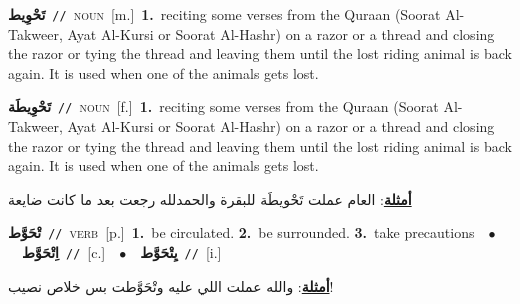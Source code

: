 \documentclass[10pt,a4paper,twoside]{article} %
\begin{document}
\begin{multicols}{2}
{\setlength\topsep{0pt}\textbf{\foreignlanguage{arabic}{تَحْوِيط}}\ {\color{gray}\texttt{//}\color{black}}\ \textsc{noun}\ [m.]\ \textbf{1.}~reciting some verses from the Quraan (Soorat Al-Takweer, Ayat Al-Kursi or Soorat Al-Hashr) on a razor or a thread and closing the razor or tying the thread and leaving them until the lost riding animal is back again. It is used when one of the animals gets lost.\ } \vspace{2mm}

{\setlength\topsep{0pt}\textbf{\foreignlanguage{arabic}{تَحْوِيطَة}}\ {\color{gray}\texttt{//}\color{black}}\ \textsc{noun}\ [f.]\ \textbf{1.}~reciting some verses from the Quraan (Soorat Al-Takweer, Ayat Al-Kursi or Soorat Al-Hashr) on a razor or a thread and closing the razor or tying the thread and leaving them until the lost riding animal is back again. It is used when one of the animals gets lost.\  \begin{flushright}\color{gray}\foreignlanguage{arabic}{\textbf{\underline{\foreignlanguage{arabic}{أمثلة}}}: العام عملت تَحْويطَة للبقرة والحمدلله رجعت بعد ما كانت ضايعة}\end{flushright}\color{black}} \vspace{2mm}

{\setlength\topsep{0pt}\textbf{\foreignlanguage{arabic}{تْحَوَّط}}\ {\color{gray}\texttt{//}\color{black}}\ \textsc{verb}\ [p.]\ \textbf{1.}~be circulated.  \textbf{2.}~be surrounded.  \textbf{3.}~take precautions\ \ $\bullet$\ \ \setlength\topsep{0pt}\textbf{\foreignlanguage{arabic}{اِتْحَوَّط}}\ {\color{gray}\texttt{//}\color{black}}\ [c.]\ \ $\bullet$\ \ \setlength\topsep{0pt}\textbf{\foreignlanguage{arabic}{يِتْحَوَّط}}\ {\color{gray}\texttt{//}\color{black}}\ [i.]\  \begin{flushright}\color{gray}\foreignlanguage{arabic}{\textbf{\underline{\foreignlanguage{arabic}{أمثلة}}}: والله عملت اللي عليه وتْحَوَّطت بس خلاص نصيب!}\end{flushright}\color{black}} \vspace{2mm}


\end{multicols}
\end{document}
